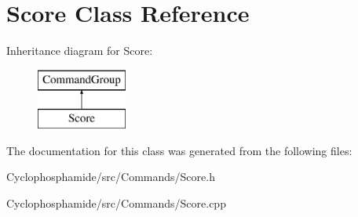 \hypertarget{class_score}{}\section{Score Class Reference}
\label{class_score}
Inheritance diagram for Score\+:\begin{figure}[H]
\begin{center}
\leavevmode
\includegraphics[height=2.000000cm]{class_score}
\end{center}
\end{figure}


The documentation for this class was generated from the following files\+:\begin{DoxyCompactItemize}
\item 
Cyclophosphamide/src/\+Commands/Score.\+h\item 
Cyclophosphamide/src/\+Commands/Score.\+cpp\end{DoxyCompactItemize}
